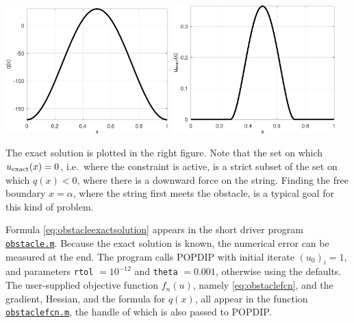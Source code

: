 \documentclass[11pt]{article}
\begin{document}
\medskip
\noindent \mbox{\includegraphics[width=0.47\textwidth]{figs/qobstacle.pdf} \qquad
\includegraphics[width=0.47\textwidth]{figs/uexactobstacle.pdf}}

The exact solution is plotted in the right figure.  Note that the set on which $u_{\text{exact}}(x)= 0$, i.e.~where the constraint is active, is a strict subset of the set on which $q(x)<0$, where there is a downward force on the string.  Finding the free boundary $x=\alpha$, where the string first meets the obstacle, is a typical goal for this kind of problem.

Formula \eqref{eq:obstacleexactsolution} appears in the short driver program \href{https://github.com/bueler/popdip/blob/main/matlab/obstacle.m}{\texttt{obstacle.m}}.  Because the exact solution is known, the numerical error can be measured at the end.  The program calls POPDIP with initial iterate $(u_0)_i=1$, and parameters \texttt{rtol} $=10^{-12}$ and \texttt{theta} $=0.001$, otherwise using the defaults.  The user-supplied objective function $f_n(u)$, namely \eqref{eq:obstaclefcn}, and the gradient, Hessian, and the formula for $q(x)$, all appear in the function \href{https://github.com/bueler/popdip/blob/main/matlab/obstaclefcn.m}{\texttt{obstaclefcn.m}}, the handle of which is also passed to POPDIP.
\end{document}
